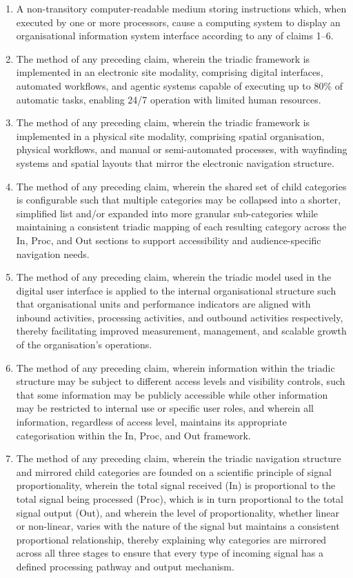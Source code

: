\documentclass[11pt,a4paper]{article}
\begin{document}
\begin{enumerate}
  \item A non-transitory computer-readable medium storing instructions which, when executed by one or more processors, cause a computing system to display an organisational information system interface according to any of claims 1--6.

  \item The method of any preceding claim, wherein the triadic framework is implemented in an electronic site modality, comprising digital interfaces, automated workflows, and agentic systems capable of executing up to 80\% of automatic tasks, enabling 24/7 operation with limited human resources.

  \item The method of any preceding claim, wherein the triadic framework is implemented in a physical site modality, comprising spatial organisation, physical workflows, and manual or semi-automated processes, with wayfinding systems and spatial layouts that mirror the electronic navigation structure.

  \item The method of any preceding claim, wherein the shared set of child categories is configurable such that multiple categories may be collapsed into a shorter, simplified list and/or expanded into more granular sub-categories while maintaining a consistent triadic mapping of each resulting category across the In, Proc, and Out sections to support accessibility and audience-specific navigation needs.

  \item The method of any preceding claim, wherein the triadic model used in the digital user interface is applied to the internal organisational structure such that organisational units and performance indicators are aligned with inbound activities, processing activities, and outbound activities respectively, thereby facilitating improved measurement, management, and scalable growth of the organisation's operations.

  \item The method of any preceding claim, wherein information within the triadic structure may be subject to different access levels and visibility controls, such that some information may be publicly accessible while other information may be restricted to internal use or specific user roles, and wherein all information, regardless of access level, maintains its appropriate categorisation within the In, Proc, and Out framework.

  \item The method of any preceding claim, wherein the triadic navigation structure and mirrored child categories are founded on a scientific principle of signal proportionality, wherein the total signal received (In) is proportional to the total signal being processed (Proc), which is in turn proportional to the total signal output (Out), and wherein the level of proportionality, whether linear or non-linear, varies with the nature of the signal but maintains a consistent proportional relationship, thereby explaining why categories are mirrored across all three stages to ensure that every type of incoming signal has a defined processing pathway and output mechanism.


\end{enumerate}
\end{document}
